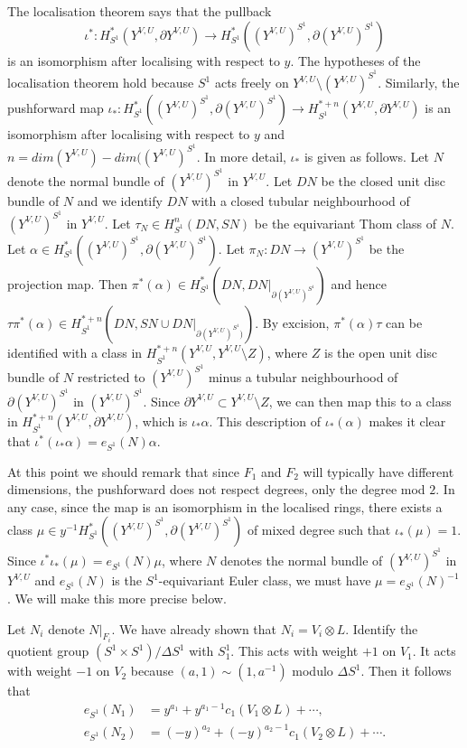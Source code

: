 \documentclass{amsart}
\theoremstyle{definition}
\theoremstyle{remark}
\numberwithin{equation}{section}
\begin{document}
The localisation theorem \cite[III (3.8)]{die} says that the pullback 
\[
\iota^* : H^*_{S^1}( Y^{V,U} , \partial Y^{V,U}) \to H^*_{S^1}( (Y^{V,U})^{S^1} , \partial (Y^{V,U})^{S^1})
\]
is an isomorphism after localising with respect to $y$. The hypotheses of the localisation theorem hold because $S^1$ acts freely on $Y^{V,U} \setminus (Y^{V,U})^{S^1}$. Similarly, the pushforward map $\iota_* : H^*_{S^1}( (Y^{V,U})^{S^1} , \partial (Y^{V,U})^{S^1} ) \to H^{*+n}_{S^1}( Y^{V,U} , \partial Y^{V,U})$ is an isomorphism after localising with respect to $y$ and $n = dim(Y^{V,U}) - dim((Y^{V,U})^{S^1}$. In more detail, $\iota_*$ is given as follows. Let $N$ denote the normal bundle of $(Y^{V,U})^{S^1}$ in $Y^{V,U}$. Let $DN$ be the closed unit disc bundle of $N$ and we identify $DN$ with a closed tubular neighbourhood of $(Y^{V,U})^{S^1}$ in $Y^{V,U}$. Let $\tau_N \in H^n_{S^1}( DN , SN )$ be the equivariant Thom class of $N$. Let $\alpha \in H^*_{S^1}( (Y^{V,U})^{S^1} , \partial (Y^{V,U})^{S^1})$. Let $\pi_N : DN \to (Y^{V,U})^{S^1}$ be the projection map. Then $\pi^*(\alpha) \in H^*_{S^1}( DN , DN|_{\partial (Y^{V,U})^{S^1}})$ and hence $\tau \pi^*(\alpha) \in H^{*+n}_{S^1}( DN , SN \cup DN|_{\partial (Y^{V,U})^{S^1})})$. By excision, $\pi^*(\alpha)\tau$ can be identified with a class in $H^{*+n}_{S^1}( Y^{V,U} , Y^{V,U} \setminus Z)$, where $Z$ is the open unit disc bundle of $N$ restricted to $(Y^{V,U})^{S^1}$ minus a tubular neighbourhood of $\partial (Y^{V,U})^{S^1}$ in $(Y^{V,U})^{S^1}$. Since $\partial Y^{V,U} \subset Y^{V,U} \setminus Z$, we can then map this to a class in $H^{*+n}_{S^1}( Y^{V,U} , \partial Y^{V,U})$, which is $\iota_* \alpha$. This description of $\iota_*(\alpha)$ makes it clear that $\iota^*( \iota_* \alpha ) = e_{S^1}(N) \alpha$.

At this point we should remark that since $F_1$ and $F_2$ will typically have different dimensions, the pushforward does not respect degrees, only the degree mod $2$. In any case, since the map is an isomorphism in the localised rings, there exists a class $\mu \in y^{-1}H^*_{S^1}( (Y^{V,U})^{S^1} , \partial (Y^{V,U})^{S^1})$ of mixed degree such that $\iota_*(\mu) = 1$. Since $\iota^* \iota_*(\mu) = e_{S^1}(N)\mu$, where $N$ denotes the normal bundle of $(Y^{V,U})^{S^1}$ in $Y^{V,U}$ and $e_{S^1}(N)$ is the $S^1$-equivariant Euler class, we must have $\mu = e_{S^1}(N)^{-1}$. We will make this more precise below. 

Let $N_i$ denote $N|_{F_i}$. We have already shown that $N_i = V_i \otimes L$. Identify the quotient group $(S^1 \times S^1)/\Delta S^1$ with $S^1_1$. This acts with weight $+1$ on $V_1$. It acts with weight $-1$ on $V_2$ because $(a,1) \sim (1,a^{-1})$ modulo $\Delta S^1$. Then it follows that
\begin{align*}
e_{S^1}(N_1) &= y^{a_1} + y^{a_1-1}c_1(V_1 \otimes L) + \cdots, \\
e_{S^1}(N_2) &= (-y)^{a_2} + (-y)^{a_2-1}c_1(V_2 \otimes L) + \cdots.
\end{align*}
\end{document}
